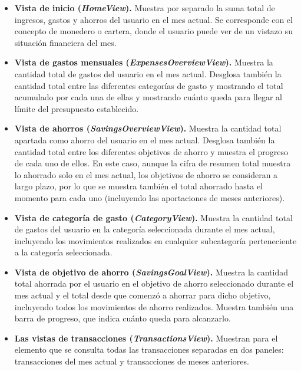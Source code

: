 \begin{itemize}
    \item \textbf{Vista de inicio (\textit{HomeView}).} Muestra por separado la suma total de ingresos, gastos y ahorros del usuario en el mes actual. Se corresponde con el concepto de monedero o cartera, donde el usuario puede ver de un vistazo su situación financiera del mes.
    \item \textbf{Vista de gastos mensuales (\textit{ExpensesOverviewView}).} Muestra la cantidad total de gastos del usuario en el mes actual. Desglosa también la cantidad total entre las diferentes categorías de gasto y mostrando el total acumulado por cada una de ellas y mostrando cuánto queda para llegar al límite del presupuesto establecido.
    \item \textbf{Vista de ahorros (\textit{SavingsOverviewView}).} Muestra la cantidad total apartada como ahorro del usuario en el mes actual. Desglosa también la cantidad total entre los diferentes objetivos de ahorro y muestra el progreso de cada uno de ellos. En este caso, aunque la cifra de resumen total muestra lo ahorrado solo en el mes actual, los objetivos de ahorro se consideran a largo plazo, por lo que se muestra también el total ahorrado hasta el momento para cada uno (incluyendo las aportaciones de meses anteriores).
    \item \textbf{Vista de categoría de gasto (\textit{CategoryView}).} Muestra la cantidad total de gastos del usuario en la categoría seleccionada durante el mes actual, incluyendo los movimientos realizados en cualquier subcategoría perteneciente a la categoría seleccionada.
    \item \textbf{Vista de objetivo de ahorro (\textit{SavingsGoalView}).} Muestra la cantidad total ahorrada por el usuario en el objetivo de ahorro seleccionado durante el mes actual y el total desde que comenzó a ahorrar para dicho objetivo, incluyendo todos los movimientos de ahorro realizados. Muestra también una barra de progreso, que indica cuánto queda para alcanzarlo. 
    \item \textbf{Las vistas de transacciones (\textit{TransactionsView}).} Muestran para el elemento que se consulta todas las transacciones separadas en dos paneles: transacciones del mes actual y transacciones de meses anteriores.
\end{itemize}

